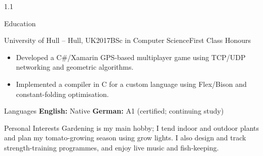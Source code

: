 \documentclass{cv}
\begin{document}
\begin{spacing}{1.1}
\begin{rSection}{Education}
            \item \begin{rSubsection}{University of Hull \textnormal{-- Hull, UK}}{2017}{BSc in Computer Science}{First Class Honours}
                \item \begin{itemize}
                    \item Developed a C\#/Xamarin GPS-based multiplayer game using TCP/UDP networking and geometric algorithms.
                    \item Implemented a compiler in C for a custom language using Flex/Bison and constant-folding optimisation.
                \end{itemize}
            \end{rSubsection}
        \end{rSection}
        
        \begin{rSection}{Languages}
            \textbf{English:} Native \hspace{1cm}\textbar{}\hspace{1cm} \textbf{German:} A1 (certified; continuing study)
        \end{rSection}
        
        \begin{rSection}{Personal Interests}
            Gardening is my main hobby; I tend indoor and outdoor plants and plan my tomato-growing season using grow lights. I also design and track strength-training programmes, and enjoy live music and fish-keeping.
        \end{rSection}
    \end{spacing}
\end{document}
